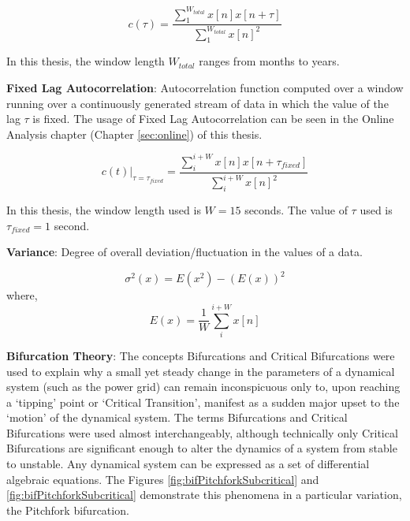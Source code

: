 \begin{equation}
	c(\tau) = \frac{\sum_{1}^{W_{total}} x[n]x[n+\tau]}{\sum_{1}^{W_{total}} x[n]^2} 
\end{equation}
 
 In this thesis, the window length $W_{total}$ ranges from months to years.
 
 \textbf{Fixed Lag Autocorrelation}: Autocorrelation function computed over a window running over a continuously generated stream of data in which the value of the lag $\tau$ is fixed. The usage of Fixed Lag Autocorrelation can be seen in the Online Analysis chapter (Chapter \ref{sec:online}) of this thesis.
 
 \begin{equation}
 	c(t)|_{\tau = \tau_{fixed}} = \frac{\sum_{i}^{i+W} x[n]x[n+\tau_{fixed}]}{\sum_{i}^{i+W} x[n]^2} 
 \end{equation}
 
 In this thesis, the window length used is $W=15$ seconds. The value of $\tau$ used is $\tau_{fixed}=1$ second.

\textbf{Variance}: Degree of overall deviation/fluctuation in the values of a data.

\begin{equation}
	\sigma^2(x) = E(x^2) - (E(x))^2 
\end{equation}
\hspace{75pt} where,
\begin{equation}
	E(x) = \frac{1}{W} \sum_{i}^{i+W} x[n]
\end{equation}

\textbf{Bifurcation Theory}: The concepts Bifurcations and Critical Bifurcations were used to explain why a small yet steady change in the parameters of a dynamical system (such as the power grid) can remain inconspicuous only to, upon reaching a `tipping' point or `Critical Transition', manifest as a sudden major upset to the `motion' of the dynamical system. The terms Bifurcations and Critical Bifurcations were used almost interchangeably, although technically only Critical Bifurcations are significant enough to alter the dynamics of a system from stable to unstable. Any dynamical system can be expressed as a set of differential algebraic equations. The  Figures \ref{fig:bifPitchforkSubcritical} and \ref{fig:bifPitchforkSubcritical} demonstrate this phenomena in a particular variation, the Pitchfork bifurcation.


